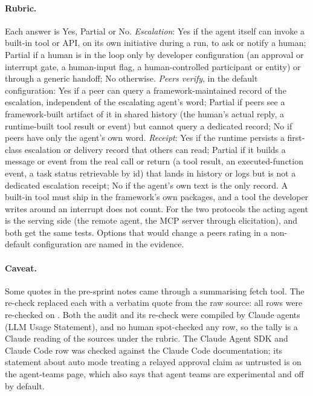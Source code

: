 \paragraph{Rubric.}
Each answer is Yes, Partial or No.
\emph{Escalation}: Yes if the agent itself can invoke a built-in tool or API, on its own initiative during a run, to ask or notify a human; Partial if a human is in the loop only by developer configuration (an approval or interrupt gate, a human-input flag, a human-controlled participant or entity) or through a generic handoff; No otherwise.
\emph{Peers verify}, in the default configuration: Yes if a peer can query a framework-maintained record of the escalation, independent of the escalating agent's word; Partial if peers see a framework-built artifact of it in shared history (the human's actual reply, a runtime-built tool result or event) but cannot query a dedicated record; No if peers have only the agent's own word.
\emph{Receipt}: Yes if the runtime persists a first-class escalation or delivery record that others can read; Partial if it builds a message or event from the real call or return (a tool result, an executed-function event, a task status retrievable by id) that lands in history or logs but is not a dedicated escalation receipt; No if the agent's own text is the only record.
A built-in tool must ship in the framework's own packages, and a tool the developer writes around an interrupt does not count.
For the two protocols the acting agent is the serving side (the \AtwoA{} remote agent, the MCP server through elicitation), and both get the same tests.
Options that would change a peers rating in a non-default configuration are named in the evidence.

\paragraph{Caveat.}
Some quotes in the pre-sprint notes came through a summarising fetch tool.
The re-check replaced each with a verbatim quote from the raw source: all \wtthAuditN{} rows were re-checked on \wtthDesignOssAuditRecheckDate.
Both the audit and its re-check were compiled by Claude agents (LLM Usage Statement), and no human spot-checked any row, so the tally is a Claude reading of the sources under the rubric.
The Claude Agent SDK and Claude Code row was checked against the Claude Code documentation; its statement about auto mode treating a relayed approval claim as untrusted is on the agent-teams page, which also says that agent teams are experimental and off by default.

